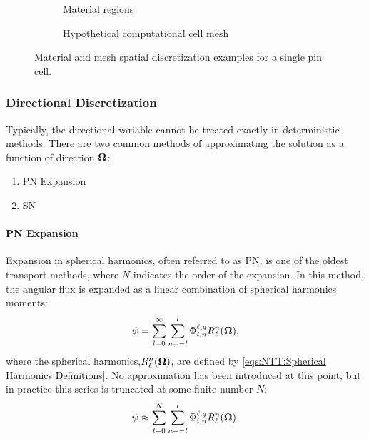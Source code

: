 {{{{        \begin{figure}[h]
          \centering
          \begin{subfigure}[t]{0.45\linewidth}
            \centering
            \def\svgwidth{\linewidth}
            
            \caption{Material regions}
            \label{fig:NTT:Pin Cell Materials}
          \end{subfigure}%
          \hfill
          \begin{subfigure}[t]{0.45\linewidth}
            \centering
            \def\svgwidth{\linewidth}
            
            \caption{Hypothetical computational cell mesh}
            \label{fig:NTT:Pin Cell Mesh}
          \end{subfigure}
          \caption{Material and mesh spatial discretization examples for a single pin cell.}
          \label{fig:NTT:Pin Cell}
        \end{figure}
      }

      \subsubsection{Directional Discretization}{\label{sssec:NTT:Directional Discretization}
        

        Typically, the directional variable cannot be treated exactly in deterministic methods.
        There are two common methods of approximating the solution as a function of direction $\boldsymbol{\Omega}$:
        \begin{enumerate}
          \item{\acf{PN} Expansion}
          \item{\acf{SN}}
        \end{enumerate}

        \paragraph{\acf{PN} Expansion} {
          Expansion in spherical harmonics, often referred to as \acs{PN}, is one of the oldest transport methods, where $N$ indicates the order of the expansion.
          In this method, the angular flux is expanded as a linear combination of spherical harmonics moments:
          \begin{equation}\label{eq:PN:PN Infinite Expansion}
            \aflux = \suml[l=0][\infty]\suml[n=-l][l]\afluxmom\SH,
          \end{equation}
          where the spherical harmonics,$\SH$, are defined by \cref{eqs:NTT:Spherical Harmonics Definitions}.
          No approximation has been introduced at this point, but in practice this series is truncated at some finite number $N$:
          \begin{equation}\label{eq:PN:PN Expansion}
            \aflux \approx \suml[l=0][N]\suml[n=-l][l]\afluxmom\SH.
          \end{equation}

}}}}}
